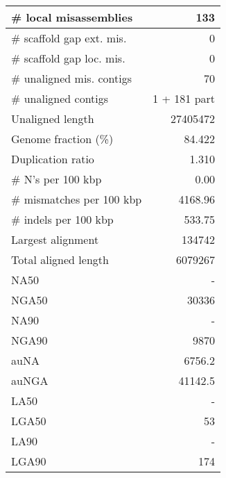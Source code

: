 \documentclass[12pt,a4paper]{article}
\begin{document}
\begin{table}[ht]
\begin{center}
\begin{tabular}{|l*{1}{|r}|}
\# local misassemblies & 133 \\ \hline
\# scaffold gap ext. mis. & 0 \\ \hline
\# scaffold gap loc. mis. & 0 \\ \hline
\# unaligned mis. contigs & 70 \\ \hline
\# unaligned contigs & 1 + 181 part \\ \hline
Unaligned length & 27405472 \\ \hline
Genome fraction (\%) & 84.422 \\ \hline
Duplication ratio & 1.310 \\ \hline
\# N's per 100 kbp & 0.00 \\ \hline
\# mismatches per 100 kbp & 4168.96 \\ \hline
\# indels per 100 kbp & 533.75 \\ \hline
Largest alignment & 134742 \\ \hline
Total aligned length & 6079267 \\ \hline
NA50 & - \\ \hline
NGA50 & 30336 \\ \hline
NA90 & - \\ \hline
NGA90 & 9870 \\ \hline
auNA & 6756.2 \\ \hline
auNGA & 41142.5 \\ \hline
LA50 & - \\ \hline
LGA50 & 53 \\ \hline
LA90 & - \\ \hline
LGA90 & 174 \\ \hline
\end{tabular}
\end{center}
\end{table}
\end{document}

